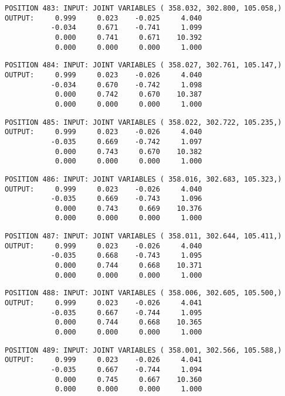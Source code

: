 \begin{verbatim}
POSITION 483: INPUT: JOINT VARIABLES ( 358.032, 302.800, 105.058,)
OUTPUT:     0.999     0.023    -0.025     4.040
           -0.034     0.671    -0.741     1.099
            0.000     0.741     0.671    10.392
            0.000     0.000     0.000     1.000
\end{verbatim} \pagebreak[1]\begin{verbatim}
POSITION 484: INPUT: JOINT VARIABLES ( 358.027, 302.761, 105.147,)
OUTPUT:     0.999     0.023    -0.026     4.040
           -0.034     0.670    -0.742     1.098
            0.000     0.742     0.670    10.387
            0.000     0.000     0.000     1.000
\end{verbatim} \pagebreak[1]\begin{verbatim}
POSITION 485: INPUT: JOINT VARIABLES ( 358.022, 302.722, 105.235,)
OUTPUT:     0.999     0.023    -0.026     4.040
           -0.035     0.669    -0.742     1.097
            0.000     0.743     0.670    10.382
            0.000     0.000     0.000     1.000
\end{verbatim} \pagebreak[1]\begin{verbatim}
POSITION 486: INPUT: JOINT VARIABLES ( 358.016, 302.683, 105.323,)
OUTPUT:     0.999     0.023    -0.026     4.040
           -0.035     0.669    -0.743     1.096
            0.000     0.743     0.669    10.376
            0.000     0.000     0.000     1.000
\end{verbatim} \pagebreak[1]\begin{verbatim}
POSITION 487: INPUT: JOINT VARIABLES ( 358.011, 302.644, 105.411,)
OUTPUT:     0.999     0.023    -0.026     4.040
           -0.035     0.668    -0.743     1.095
            0.000     0.744     0.668    10.371
            0.000     0.000     0.000     1.000
\end{verbatim} \pagebreak[1]\begin{verbatim}
POSITION 488: INPUT: JOINT VARIABLES ( 358.006, 302.605, 105.500,)
OUTPUT:     0.999     0.023    -0.026     4.041
           -0.035     0.667    -0.744     1.095
            0.000     0.744     0.668    10.365
            0.000     0.000     0.000     1.000
\end{verbatim} \pagebreak[1]\begin{verbatim}
POSITION 489: INPUT: JOINT VARIABLES ( 358.001, 302.566, 105.588,)
OUTPUT:     0.999     0.023    -0.026     4.041
           -0.035     0.667    -0.744     1.094
            0.000     0.745     0.667    10.360
            0.000     0.000     0.000     1.000
\end{verbatim} \pagebreak[1]\begin{verbatim}

\end{verbatim}
